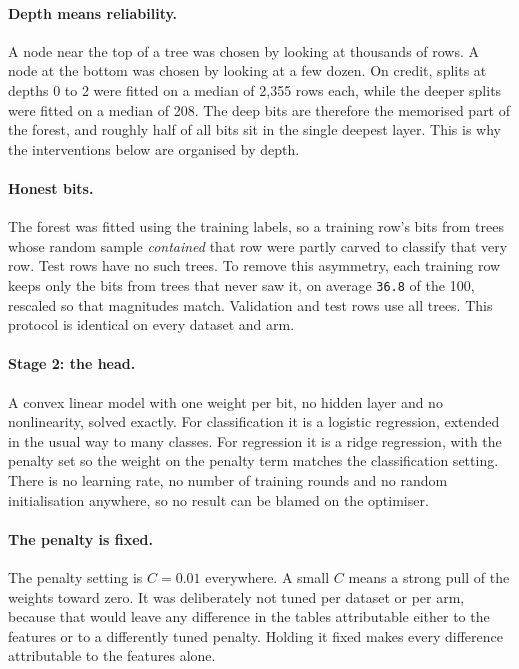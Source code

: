 \documentclass[11pt,a4paper]{article}
\newcommand{\num}[1]{\texttt{#1}}
\begin{document}
\paragraph{Depth means reliability.} A node near the top of a tree was chosen
by looking at thousands of rows. A node at the bottom was chosen by looking at
a few dozen. On credit, splits at depths 0 to 2 were fitted on a median of
2,355 rows each, while the deeper splits were fitted on a median of 208. The
deep bits are therefore the memorised part of the forest, and roughly half of
all bits sit in the single deepest layer. This is why the interventions below
are organised by depth.

\paragraph{Honest bits.} The forest was fitted using the training labels, so a
training row's bits from trees whose random sample \emph{contained} that row
were partly carved to classify that very row. Test rows have no such trees. To
remove this asymmetry, each training row keeps only the bits from trees that
never saw it, on average \num{36.8} of the 100, rescaled so that magnitudes
match. Validation and test rows use all trees. This protocol is identical on
every dataset and arm.

\paragraph{Stage 2: the head.} A convex linear model with one weight per bit,
no hidden layer and no nonlinearity, solved exactly. For classification it is a
logistic regression, extended in the usual way to many classes. For regression
it is a ridge regression, with the penalty set so the weight on the penalty
term matches the classification setting. There is no learning rate, no number
of training rounds and no random initialisation anywhere, so no result can be
blamed on the optimiser.

\paragraph{The penalty is fixed.} The penalty setting is $C = 0.01$ everywhere.
A small $C$ means a strong pull of the weights toward zero. It was deliberately
not tuned per dataset or per arm, because that would leave any difference in
the tables attributable either to the features or to a differently tuned
penalty. Holding it fixed makes every difference attributable to the features
alone.
\end{document}
